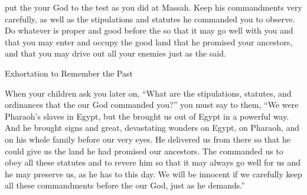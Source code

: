 {put
the {}
your God
to the test
as you did at Massah.
Keep
his commandments
very carefully,
as well
as the stipulations
and statutes
he commanded you to observe.
Do
whatever is proper
and good
before
the {}
so that it may
go well
with you and that you may enter
and occupy
the good
land
that
he promised
your ancestors,
and that you may drive
out all
your enemies
just
as the
{}
said.
\par }{\SH Exhortation to Remember the Past
\par }{\PP {}When
your children
ask
you later
on, “What
are the stipulations,
statutes,
and ordinances
that
the {}
our God
commanded you?”
you must say
to them, “We were Pharaoh’s
slaves
in Egypt,
but the
{}
brought us out
of Egypt
in a powerful way.
And he brought signs
and great,
devastating
wonders
on
Egypt,
on Pharaoh,
and on his whole
family
before our very eyes.
He delivered
us from there
so that
he could give
us the land
he had
promised
our ancestors.
The
{}
commanded
us
to obey
all
these
statutes
and to revere
him so that
it may always
go well
for us and he may preserve
us, as he has to this
day.
We will be
innocent
if
we carefully
keep
all
these commandments
before
the {}
our God,
just
as he demands.”

}
